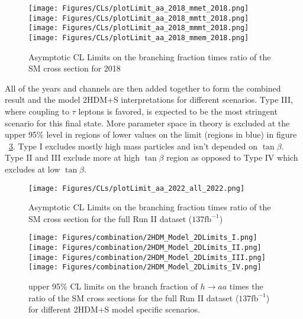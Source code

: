 \begin{figure}[ht!b]
  \centering
  \texttt{[image: Figures/CLs/plotLimit\_aa\_2018\_mmet\_2018.png]}
  \texttt{[image: Figures/CLs/plotLimit\_aa\_2018\_mmtt\_2018.png]}\\
  \texttt{[image: Figures/CLs/plotLimit\_aa\_2018\_mmmt\_2018.png]}
  \texttt{[image: Figures/CLs/plotLimit\_aa\_2018\_mmem\_2018.png]}\\
    \caption{\label{fig:CLs2018} Asymptotic CL Limits on the branching fraction times ratio of the SM cross section for 2018}
\end{figure}

\clearpage

All of the years and channels are then added together to form the combined result and the model 2HDM+S interpretations for different scenarios. Type III, where coupling to $\tau$ leptons is favored, is expected to be the most stringent scenario for this final state. More parameter space in theory is excluded at the upper 95\% level in regions of lower values on the limit (regions in blue) in figure ~\ref{fig:2HDM}. Type I excludes mostly high mass particles and isn't depended on $\tan\beta$. Type II and III exclude more at high $\tan\beta$ region as opposed to Type IV which excludes at low $\tan\beta$.

\begin{figure}[ht!b]
\label{fig:CLsRunII} 
\centering
  \texttt{[image: Figures/CLs/plotLimit\_aa\_2022\_all\_2022.png]}
    \caption{Asymptotic CL Limits on the branching fraction times ratio of the SM cross section for the full Run II dataset ($\text{137}\text{fb}^{-1}$)}
\end{figure}

\begin{figure}[ht!b]
  \centering
  \texttt{[image: Figures/combination/2HDM\_Model\_2DLimits\_I.png]}
  \texttt{[image: Figures/combination/2HDM\_Model\_2DLimits\_II.png]}\\
  \texttt{[image: Figures/combination/2HDM\_Model\_2DLimits\_III.png]}
  \texttt{[image: Figures/combination/2HDM\_Model\_2DLimits\_IV.png]}\\
    \caption{\label{fig:2HDM}  upper 95\% CL limits on the branch fraction of $h\rightarrow a a $ times the ratio of the SM cross sections for the full Run II dataset ($\text{137}\text{fb}^{-1}$) for different 2HDM+S model specific scenarios.}
\end{figure}

